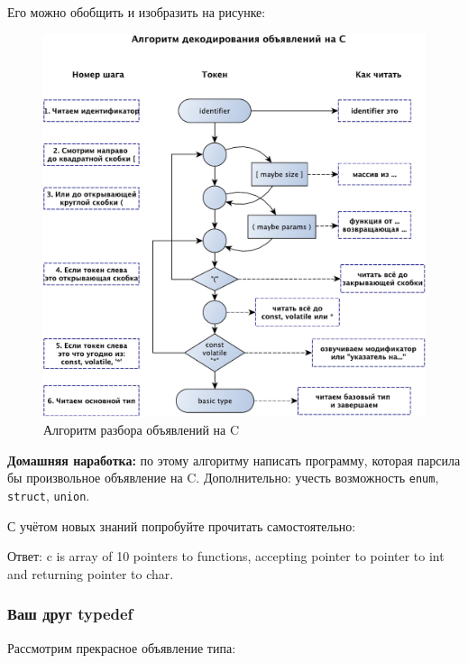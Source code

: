 \documentclass[a4paper,12pt,oneside]{article}
\begin{document}
Его можно обобщить и изобразить на рисунке:
\begin{figure}[h!]
\centering
\includegraphics[width=1.0\textwidth]{illustrations/cdecls-crop.pdf}
\caption{Алгоритм разбора объявлений на C}
\label{fig:cdecl_parse}
\end{figure}

\textbf{Домашняя наработка:} по этому алгоритму написать программу, которая парсила бы произвольное объявление на C. Дополнительно: учесть возможность \lstinline!enum!, \lstinline!struct!, \lstinline!union!.

С учётом новых знаний попробуйте прочитать самостоятельно:



Ответ: c is array of 10 pointers to functions, accepting pointer to pointer to int and returning pointer to char.

\subsubsection{Ваш друг typedef}\label{FriendTypedef}

Рассмотрим прекрасное объявление типа:


\end{document}
